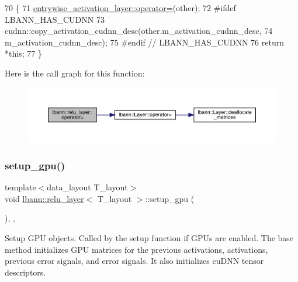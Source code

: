 \begin{DoxyCode}
70                                                  \{
71     \hyperlink{classlbann_1_1Layer_a00d8acde68fda2f38c4a39ef8c89234a}{entrywise\_activation\_layer::operator=}(other);
72 \textcolor{preprocessor}{  #ifdef LBANN\_HAS\_CUDNN}
73     cudnn::copy\_activation\_cudnn\_desc(other.m\_activation\_cudnn\_desc,
74                                       m\_activation\_cudnn\_desc);
75 \textcolor{preprocessor}{  #endif // LBANN\_HAS\_CUDNN}
76     \textcolor{keywordflow}{return} *\textcolor{keyword}{this};
77   \}
\end{DoxyCode}
Here is the call graph for this function\+:\nopagebreak
\begin{figure}[H]
\begin{center}
\leavevmode
\includegraphics[width=350pt]{classlbann_1_1relu__layer_a455500a9ee8e9fbef2db3d8943e65d7d_cgraph}
\end{center}
\end{figure}
\mbox{\label{classlbann_1_1relu__layer_a9426317aa741ab8a202ee52cf5250b59}} 
\subsubsection{\texorpdfstring{setup\+\_\+gpu()}{setup\_gpu()}}
{\footnotesize\ttfamily template$<$data\+\_\+layout T\+\_\+layout$>$ \\
void \hyperlink{classlbann_1_1relu__layer}{lbann\+::relu\+\_\+layer}$<$ T\+\_\+layout $>$\+::setup\+\_\+gpu (\begin{DoxyParamCaption}{ }\end{DoxyParamCaption})\hspace{0.3cm}{\ttfamily [inline]}, {\ttfamily [override]}, {\ttfamily [virtual]}}

Setup G\+PU objects. Called by the setup function if G\+P\+Us are enabled. The base method initializes G\+PU matrices for the previous activations, activations, previous error signals, and error signals. It also initializes cu\+D\+NN tensor descriptors. 

